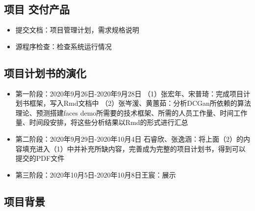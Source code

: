 \documentclass[hyperref, a4paper]{ctexart}
\providecommand{\tightlist}{%
  \setlength{\itemsep}{0pt}\setlength{\parskip}{0pt}}
\begin{document}
\hypertarget{ux9879ux76ee-ux4ea4ux4ed8ux4ea7ux54c1}{%
\subsection{项目 交付产品}\label{ux9879ux76ee-ux4ea4ux4ed8ux4ea7ux54c1}}

\begin{itemize}
\tightlist
\item
  提交文档：项目管理计划，需求规格说明
\item
  源程序检查：检查系统运行情况
\end{itemize}

\hypertarget{ux9879ux76eeux8ba1ux5212ux4e66ux7684ux6f14ux5316}{%
\subsection{项目计划书的演化}\label{ux9879ux76eeux8ba1ux5212ux4e66ux7684ux6f14ux5316}}

\begin{itemize}
\item
  第一阶段：2020年9月26日-2020年9月28日 \newline
  （1）张宏年、宋普琦：完成项目计划书框架，写入Rmd文档中 \newline
  （2）张岑湲、黄蕙茹：分析DCGan所依赖的算法理论、预测搭建faces
  \newline demo所需要的技术框架、所需的人员工作量、时间工作量、时间段安排，将这些分析结果以Rmd的形式进行汇总
\item
  第二阶段：2020年9月29日-2020年10月4日 \newline
  石睿欣、张逸涵：将上面（2）的内容填充进入（1）中并补充所缺内容，完善成为完整的项目计划书，得到可以提交的PDF文件
\item
  第三阶段：2020年10月5日-2020年10月8日\newline 王宸：展示
\end{itemize}

\hypertarget{ux9879ux76eeux80ccux666f}{%
\subsection{项目背景}\label{ux9879ux76eeux80ccux666f}}
\end{document}
